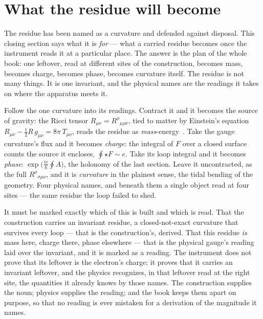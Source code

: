 \section{What the residue will become}

The residue has been named as a curvature and defended against disposal. This closing section says what it is \emph{for} ---
what a carried residue becomes once the instrument reads it at a particular place. The answer is the plan of the whole book:
one leftover, read at different sites of the construction, becomes mass, becomes charge, becomes phase, becomes curvature
itself. The residue is not many things. It is one invariant, and the physical names are the readings it takes on where the
apparatus meets it.

Follow the one curvature into its readings. Contract it and it becomes the source of gravity: the Ricci tensor $R_{\mu\nu} =
R^\rho{}_{\mu\rho\nu}$, tied to matter by Einstein's equation $R_{\mu\nu} - \tfrac{1}{2}R\,g_{\mu\nu} = 8\pi\,T_{\mu\nu}$,
reads the residue as \emph{mass}-energy~\cite{einstein1915,einstein1916}. Take the gauge curvature's flux and it becomes
\emph{charge}: the integral of $F$ over a closed surface counts the source it encloses, $\oint \star F \sim e$. Take its loop
integral and it becomes \emph{phase}: $\exp\!\big(\tfrac{ie}{\hbar}\oint A\big)$, the holonomy of the last section. Leave it
uncontracted, as the full $R^\rho{}_{\sigma\mu\nu}$, and it is \emph{curvature} in the plainest sense, the tidal bending of
the geometry. Four physical names, and beneath them a single object read at four sites --- the same residue the loop failed
to shed.

It must be marked exactly which of this is built and which is read. That the construction carries an invariant residue, a
closed-not-exact curvature that survives every loop --- that is the construction's, derived. That this residue \emph{is}
mass here, charge there, phase elsewhere --- that is the physical gauge's reading laid over the invariant, and it is marked
as a reading. The instrument does not prove that its leftover is the electron's charge; it proves that it carries an
invariant leftover, and the physics recognizes, in that leftover read at the right site, the quantities it already knows by
those names. The construction supplies the noun; physics supplies the reading; and the book keeps them apart on purpose, so
that no reading is ever mistaken for a derivation of the magnitude it names.


